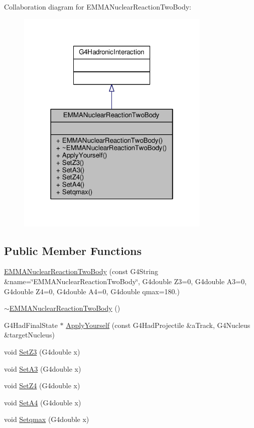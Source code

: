 Collaboration diagram for E\+M\+M\+A\+Nuclear\+Reaction\+Two\+Body\+:
\nopagebreak
\begin{figure}[H]
\begin{center}
\leavevmode
\includegraphics[width=262pt]{classEMMANuclearReactionTwoBody__coll__graph}
\end{center}
\end{figure}
\subsection*{Public Member Functions}
\begin{DoxyCompactItemize}
\item 
\hyperlink{classEMMANuclearReactionTwoBody_a0dd02a4c8d38a6916e7ed23cc9e213a8}{E\+M\+M\+A\+Nuclear\+Reaction\+Two\+Body} (const G4\+String \&name=\char`\"{}E\+M\+M\+A\+Nuclear\+Reaction\+Two\+Body\char`\"{}, G4double Z3=0, G4double A3=0, G4double Z4=0, G4double A4=0, G4double qmax=180.)
\item 
\hyperlink{classEMMANuclearReactionTwoBody_a57ec6f0f1f8bcf8594a8a5809d9b38e5}{$\sim$\+E\+M\+M\+A\+Nuclear\+Reaction\+Two\+Body} ()
\item 
G4\+Had\+Final\+State $\ast$ \hyperlink{classEMMANuclearReactionTwoBody_adabd41fecb77c840a16563a1a634d801}{Apply\+Yourself} (const G4\+Had\+Projectile \&a\+Track, G4\+Nucleus \&target\+Nucleus)
\item 
void \hyperlink{classEMMANuclearReactionTwoBody_a9447090cb2afa0ef5a32aae528e264c0}{Set\+Z3} (G4double x)
\item 
void \hyperlink{classEMMANuclearReactionTwoBody_a021a4d5414273ec6804f3dec14abceec}{Set\+A3} (G4double x)
\item 
void \hyperlink{classEMMANuclearReactionTwoBody_a587804c646adcdd2faf82911653fd563}{Set\+Z4} (G4double x)
\item 
void \hyperlink{classEMMANuclearReactionTwoBody_a3dacff6490f78c2697b85d7c7e03944a}{Set\+A4} (G4double x)
\item 
void \hyperlink{classEMMANuclearReactionTwoBody_ad58d8bd62381f9b6b8a65c4c929dca53}{Setqmax} (G4double x)
\end{DoxyCompactItemize}



